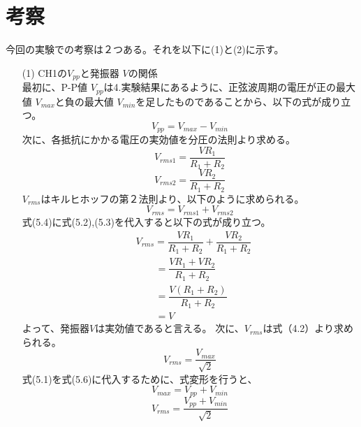 \documentclass[12pt,a4paper]{jsarticle}
\numberwithin{equation}{section}
\numberwithin{figure}{section}
\numberwithin{table}{section}
\begin{document}
\section{考察}
今回の実験での考察は２つある。それを以下に(1)と(2)に示す。
\begin{itemize}
	\item [(1)]CH1の$V_{pp}$と発振器 $V$の関係\\最初に、P-P値 $V_{pp}$は4.実験結果にあるように、正弦波周期の電圧が正の最大値 $V_{max}$と負の最大値 $V_{min}$を足したものであることから、以下の式が成り立つ。
						\begin{equation}
							V_{pp}=V_{max}-V_{min}
						\end{equation}
						次に、各抵抗にかかる電圧の実効値を分圧の法則より求める。
						\begin{equation}
							V_{rms1}=\dfrac{VR_1}{R_1+R_2}
						\end{equation}
						\begin{equation}
							V_{rms2}=\dfrac{VR_2}{R_1+R_2}
						\end{equation}
						$V_{rms}$はキルヒホッフの第２法則より、以下のように求められる。
						\begin{equation}
							V_{rms}=V_{rms1}+V_{rms2}
						\end{equation}
						式(5.4)に式(5.2),(5.3)を代入すると以下の式が成り立つ。
						\begin{equation}
							\begin{split}
								&V_{rms}=\dfrac{VR_1}{R_1+R_2}+\dfrac{VR_2}{R_1+R_2}\\
								&\quad\quad=\dfrac{{VR_1}+{VR_2}}{{R_1+R_2}}\\
								&\quad\quad=\dfrac{V(R_1+R_2)}{{R_1+R_2}}\\
								&\quad\quad=V
							\end{split}
						\end{equation}
						よって、発振器$V$は実効値であると言える。
						次に、$V_{rms}$は式（4.2）より求められる。
						\begin{equation}
							V_{rms}=\dfrac{V_{max}}{\sqrt{2}}
						\end{equation}
						式(5.1)を式(5.6)に代入するために、式変形を行うと、
						\begin{equation}
							V_{max}=V_{pp}+V_{min}
						\end{equation}
						\begin{equation}
							V_{rms}=\dfrac{V_{pp}+V_{min}}{\sqrt{2}}
						\end{equation}

\end{itemize}
\end{document}
